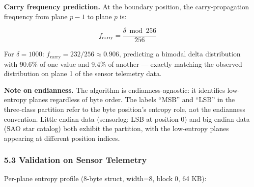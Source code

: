 \documentclass[
  11pt,
  letterpaper,
]{article}
\makeatletter
\renewcommand{\_}{\bpd@origunderscore\allowbreak}
\makeatother
\begin{document}
\textbf{Carry frequency prediction.} At the boundary position, the
carry-propagation frequency from plane \(p-1\) to plane \(p\) is:

\[f_{\text{carry}} = \frac{\delta \bmod 256}{256}\]

For \(\delta = 1000\): \(f_{\text{carry}} = 232/256 \approx 0.906\),
predicting a bimodal delta distribution with 90.6\% of one value and
9.4\% of another --- exactly matching the observed distribution on plane
1 of the sensor telemetry data.

\textbf{Note on endianness.} The algorithm is endianness-agnostic: it
identifies low-entropy planes regardless of byte order. The labels
``MSB'' and ``LSB'' in the three-class partition refer to the byte
position's entropy role, not the endianness convention. Little-endian
data (sensor\_log: LSB at position 0) and big-endian data (SAO star
catalog) both exhibit the partition, with the low-entropy planes
appearing at different position indices.

\hypertarget{validation-on-sensor-telemetry}{%
\subsubsection{5.3 Validation on Sensor
Telemetry}\label{validation-on-sensor-telemetry}}

Per-plane entropy profile (8-byte struct, width=8, block 0, 64 KB):
\end{document}
